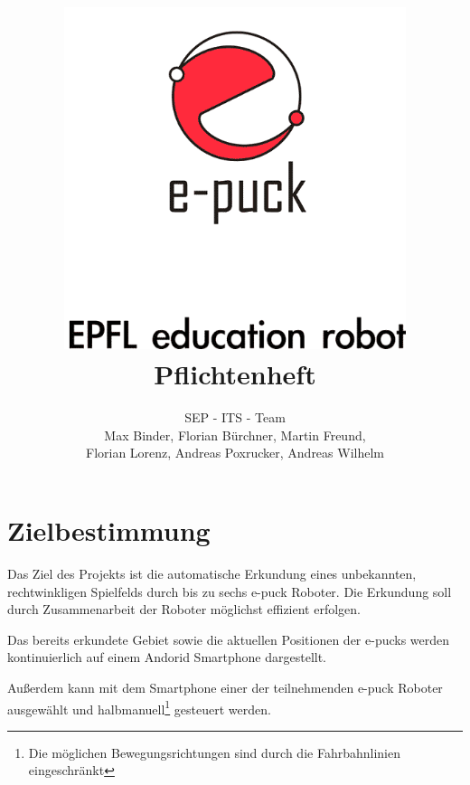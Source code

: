 \documentclass[10pt,a4paper]{article}
\title{
	\includegraphics[width=10cm]{logo.png} \\
	\vspace{1cm}
	Pflichtenheft
}
\author{SEP - ITS - Team \\ Max Binder, Florian Bürchner, Martin Freund, \\Florian Lorenz,
											Andreas Poxrucker, Andreas Wilhelm}
\let\oldsection\section
\renewcommand{\section}{\newpage \oldsection}
\begin{document}
	\maketitle
	\newpage
	\tableofcontents	
	\newpage
	
	\section{Zielbestimmung}
		Das Ziel des Projekts ist die automatische Erkundung eines unbekannten, rechtwinkligen Spielfelds durch bis zu
		sechs e-puck Roboter. Die Erkundung soll durch Zusammenarbeit der Roboter möglichst effizient erfolgen.
		
		Das bereits erkundete Gebiet sowie die aktuellen Positionen der e-pucks werden kontinuierlich auf einem
		Andorid Smartphone dargestellt.
		
		Außerdem kann mit dem Smartphone einer der teilnehmenden e-puck Roboter ausgewählt und halbmanuell\footnote{Die
			möglichen Bewegungsrichtungen sind durch die Fahrbahnlinien eingeschränkt}  gesteuert werden.
\end{document}
